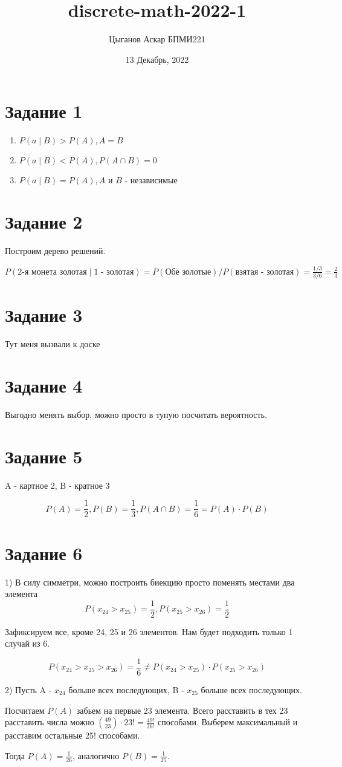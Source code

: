 \documentclass[a4paper]{article}
\title{discrete-math-2022-1}
\author{Цыганов Аскар БПМИ221}
\date{13 Декабрь, 2022}
\newcommand{\task}[1]{\section*{Задание #1}}
\begin{document}
\maketitle


\task{1}

\begin{enumerate}
    \item $P(a \mid B) > P(A), A = B$
    \item $P(a \mid B) < P(A), P(A \cap B) = 0$
    \item $P(a \mid B) = P(A), A $ и $ B$ - независимые
\end{enumerate}

\task{2}

Построим дерево решений.

$P(\text{2-я монета золотая} \mid \text{1 - золотая}) = P(\text{Обе золотые}) / P(\text{взятая - золотая}) = \frac{1/3}{3/6} = \frac{2}{3}$

\task{3}

Тут меня вызвали к доске %

\task{4}

Выгодно менять выбор, можно просто в тупую посчитать вероятность.

\task{5}

A - картное 2, B - кратное 3

\begin{equation*}
    P(A) = \frac{1}{2}, P(B) = \frac{1}{3}, P(A \cap B) = \frac{1}{6} = P(A) \cdot P(B)
\end{equation*}

\task{6}

1) В силу симметри, можно построить биекцию просто поменять местами два элемента
$$P(x_{24} > x_{25}) = \frac{1}{2}, P(x_{25} > x_{26}) = \frac{1}{2}$$

Зафиксируем все, кроме 24, 25 и 26 элементов. Нам будет подходить только 1 случай из 6.

$$P(x_{24} > x_{25} > x_{26}) = \frac{1}{6} \neq P(x_{24} > x_{25}) \cdot P(x_{25} > x_{26})$$

2) Пусть A - $x_{24}$ больше всех последующих, B - $x_{25}$ больше всех последующих.

Посчитаем $P(A)$ забьем на первые 23 элемента. Всего расставить в тех 23 расставить числа
можно $\binom{49}{23} \cdot 23! = \frac{49!}{26!}$ способами. Выберем максимальный и расставим остальные 25! способами.

Тогда $P(A) = \frac{1}{26}$, аналогично $P(B) = \frac{1}{25}$.
\end{document}
